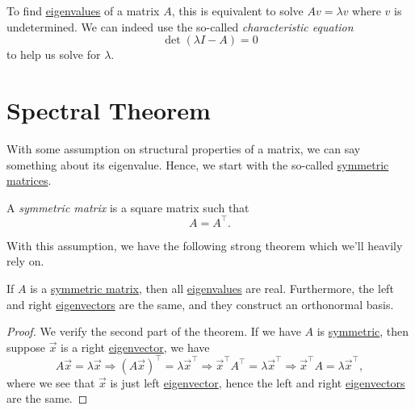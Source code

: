 \begin{note}\label{note:characteristic-equation}
	To find \hyperref[def:eigenvalue]{eigenvalues} of a matrix \(A\), this is equivalent to solve \(Av = \lambda v\) where \(v\) is undetermined. We can indeed use the so-called \emph{characteristic equation}
	\[
		\det(\lambda I - A) = 0
	\]
	to help us solve for \(\lambda \).
\end{note}

\section{Spectral Theorem}
With some assumption on structural properties of a matrix, we can say something about its eigenvalue. Hence, we start with the so-called \hyperref[def:symmetric-matrix]{symmetric matrices}.

\begin{definition}\label{def:symmetric-matrix}
	A \emph{symmetric matrix} is a square matrix such that
	\[
		A = A^{\top}.
	\]
\end{definition}

With this assumption, we have the following strong theorem which we'll heavily rely on.

\begin{theorem}\label{thm:spectral-theorem}
	If \(A\) is a \hyperref[def:symmetric-matrix]{symmetric matrix}, then all \hyperref[def:eigenvalue]{eigenvalues} are real. Furthermore, the left and right \hyperref[def:eigenvector]{eigenvectors} are the same, and they construct an orthonormal basis.
\end{theorem}
\begin{proof}
	We verify the second part of the theorem.  If we have \(A\) is \hyperref[def:symmetric-matrix]{symmetric}, then suppose \(\vec{x} \) is a right \hyperref[def:eigenvector]{eigenvector}, we have
	\[
		A \vec{x} = \lambda \vec{x}\Rightarrow
		(A \vec{x})^{\top} = \lambda \vec{x}^{\top}\Rightarrow
		\vec{x}^{\top} A^{\top} = \lambda\vec{x}^{\top}\Rightarrow
		\vec{x}^{\top} A = \lambda\vec{x}^{\top},
	\]
	where we see that \(\vec{x}\) is just left \hyperref[def:eigenvector]{eigenvector}, hence the left and right \hyperref[def:eigenvector]{eigenvectors} are the same.
\end{proof}